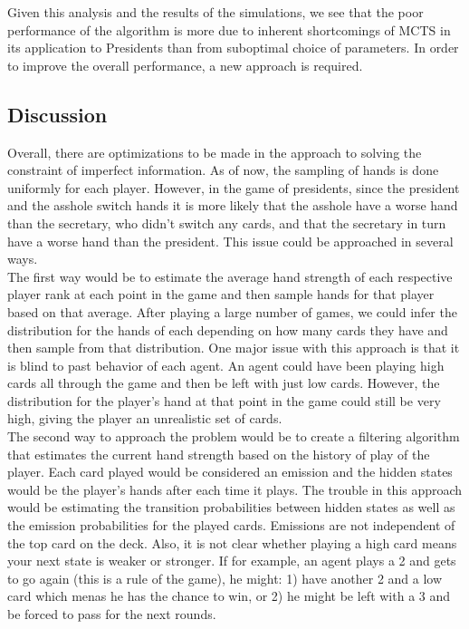 \documentclass[11pt]{article}
\begin{document}
Given this analysis and the results of the simulations, we see that the poor performance of the algorithm is more due to inherent shortcomings of MCTS in its application to Presidents than from suboptimal choice of parameters. In order to improve the overall performance, a new approach is required.


 
\subsection{Discussion}
Overall, there are optimizations to be made in the approach to solving the constraint of imperfect information. As of now, the sampling of hands is done uniformly for each player. However, in the game of presidents, since the president and the asshole switch hands it is more likely that the asshole have a worse hand than the secretary, who didn't switch any cards, and that the secretary in turn have a worse hand than the president. This issue could be approached in several ways.\\

The first way would be to estimate the average hand strength of each respective player rank at each point in the game and then sample hands for that player based on that average. After playing a large number of games, we could infer the distribution for the hands of each depending on how many cards they have and then sample from that distribution. One major issue with this approach is that it is blind to past behavior of each agent. An agent could have been playing high cards all through the game and then be left with just low cards. However, the distribution for the player's hand at that point in the game could still be very high, giving the player an unrealistic set of cards.\\

 The second way to approach the problem would be to create a filtering algorithm that estimates the current hand strength based on the history of play of the player. Each card played would be considered an emission and the hidden states would be the player's hands after each time it plays. The trouble in this approach would be estimating the transition probabilities between hidden states as well as the emission probabilities for the played cards. Emissions are not independent of the top card on the deck. Also, it is not clear whether playing a high card means your next state is weaker or stronger. If for example, an agent plays a 2 and gets to go again (this is a rule of the game), he might: 1) have another 2 and a low card which menas he has the chance to win, or 2) he might be left with a 3 and be forced to pass for the next rounds.\\
\end{document}
